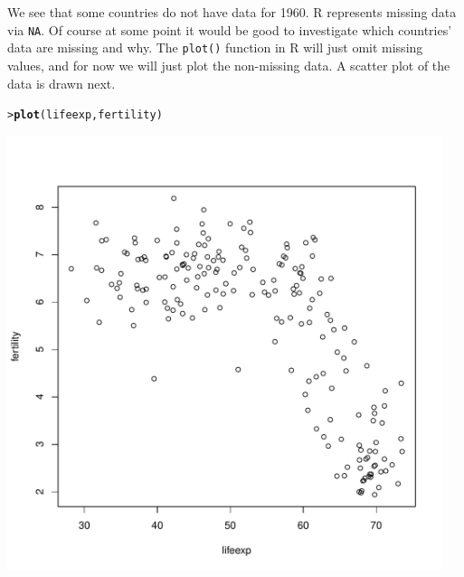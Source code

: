\documentclass[12pt,oneside]{book}\usepackage[]{graphicx}\usepackage[]{color}
\makeatletter
\newcommand{\hlstd}[1]{\textcolor[rgb]{0.345,0.345,0.345}{#1}}%
\newcommand{\hlkwd}[1]{\textcolor[rgb]{0.737,0.353,0.396}{\textbf{#1}}}%
\newenvironment{kframe}{%
 \def\at@end@of@kframe{}%
 \ifinner\ifhmode%
  \def\at@end@of@kframe{\end{minipage}}%
  \begin{minipage}{\columnwidth}%
 \fi\fi%
 \def\FrameCommand##1{\hskip\@totalleftmargin \hskip-\fboxsep
 \colorbox{shadecolor}{##1}\hskip-\fboxsep
     \hskip-\linewidth \hskip-\@totalleftmargin \hskip\columnwidth}%
 \MakeFramed {\advance\hsize-\width
   \@totalleftmargin\z@ \linewidth\hsize
   \@setminipage}}%
 {\par\unskip\endMakeFramed%
 \at@end@of@kframe}
\newenvironment{knitrout}{}{} %
\makeatother
\begin{document}
We see that some countries do not have data for 1960. R represents missing data via \verb+NA+. Of course at some point it would be good to investigate which countries' data are missing and why. The \verb+plot()+ function in R will just omit missing values, and for now we will just plot the non-missing data. A scatter plot of the data is drawn next.
\begin{knitrout}
\color{fgcolor}\begin{kframe}
\begin{alltt}
\hlstd{> }\hlkwd{plot}\hlstd{(lifeexp, fertility)}
\end{alltt}
\end{kframe}
\includegraphics[width=5in,height=5in]{figure/unnamed-chunk-22-1} 

\end{knitrout}
\end{document}
